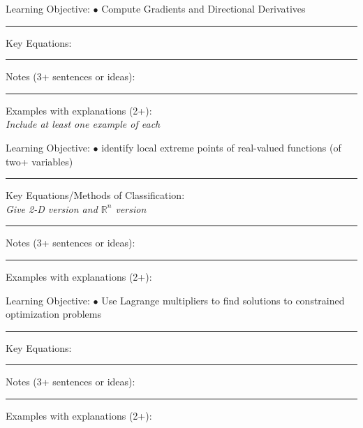 \documentclass{article}
\theoremstyle{plain}
\theoremstyle{definition}
\theoremstyle{remark}
\begin{document}
\vskip-2pt
\noindent \large Learning Objective:
\normalsize
\vskip0.15in
$\bullet$ Compute Gradients and Directional Derivatives
\vskip0.15in
\hrule
\vspace{0.1in}
\large \noindent Key Equations:
\normalsize

\vspace{1in}
\hrule
\vspace{0.1in}
\large \noindent Notes (3+ sentences or ideas):
\normalsize
\vspace{1.75in}
\hrule
\vspace{0.1in}

\large \noindent Examples with explanations (2+):\\
\emph{Include at least one example of each}

\newpage
\noindent \large Learning Objective:
\normalsize
\vskip0.15in
$\bullet$ identify local extreme points of real-valued functions (of two+ variables)
\vskip0.15in
\hrule
\vspace{0.1in}
\large \noindent Key Equations/Methods of Classification:\\
\emph{Give 2-D version and $\mathbb{R}^n$ version}
\normalsize

\vspace{1in}
\hrule
\vspace{0.1in}
\large \noindent Notes (3+ sentences or ideas):
\normalsize
\vspace{1.75in}
\hrule
\vspace{0.1in}

\large \noindent Examples with explanations (2+):

\newpage
\noindent \large Learning Objective:
\normalsize
\vskip0.15in
$\bullet$ Use Lagrange multipliers to find solutions to constrained optimization problems
\vskip0.15in
\hrule
\vspace{0.1in}
\large \noindent Key Equations:
\normalsize

\vspace{1in}
\hrule
\vspace{0.1in}
\large \noindent Notes (3+ sentences or ideas):
\normalsize
\vspace{1.75in}
\hrule
\vspace{0.1in}

\large \noindent Examples with explanations (2+):\\
\normalsize
\end{document}
